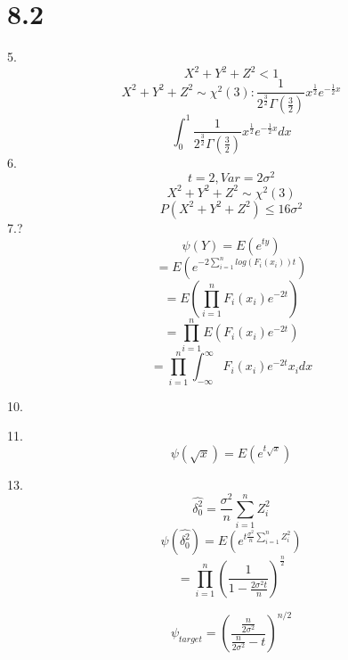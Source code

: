 \documentclass[12pt, a4paper, twocolumn]{article}
\begin{document}
\section*{8.2}
5.
$$X^2 + Y^2 + Z^2 < 1$$
$$X^2 + Y^2 + Z^2 \sim \chi^2(3): \frac{1}{2^{\frac{3}{2}}\Gamma(\frac{3}{2})}x^{\frac{1}{2}}e^{-\frac{1}{2}x}$$
$$\int_{0}^{1}\frac{1}{2^{\frac{3}{2}}\Gamma(\frac{3}{2})}x^{\frac{1}{2}}e^{-\frac{1}{2}x}dx$$
6.
$$t = 2, Var = 2\sigma^2$$
$$X^2 + Y^2 + Z^2 \sim \chi^2(3)$$
$$P(X^2 + Y^2 + Z^2) \leqslant 16\sigma^2$$
7.?
$$\psi(Y) = E(e^{ty})$$
$$ = E(e^{-2\sum_{i = 1}^nlog(F_i(x_i))t})$$
$$ = E(\prod_{i = 1}^nF_i(x_i)e^{-2t})$$
$$ = \prod_{i = 1}^nE(F_i(x_i)e^{-2t})$$
$$ = \prod_{i = 1}^n\int_{-\infty}^{\infty}F_i(x_i)e^{-2t}x_idx$$

10.

11.
$$\psi(\sqrt{x}) = E(e^{t\sqrt{x}})$$

13.
$$\hat{\delta^2_0} = \frac{\sigma^2}{n}\sum_{i = 1}^n Z_i^2 $$
$$\psi(\hat{\delta^2_0}) = E(e^{t\frac{\sigma^2}{n}\sum_{i = 1}^n Z_i^2}) $$
$$=  \prod_{i = 1}^n(\frac{1}{1 - \frac{2\sigma^2t}{n}})^{\frac{n}{2}}$$

$$\psi_{target} = (\frac{\frac{n}{2\sigma^2}}{\frac{n}{2\sigma^2} - t})^{n/2}$$
\end{document}
